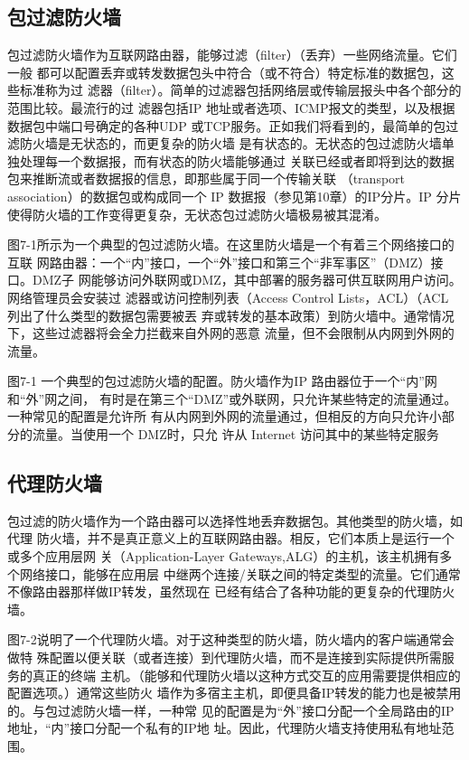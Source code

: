 \subsection{包过滤防火墙}

包过滤防火墙作为互联网路由器，能够过滤（filter）（丢弃）一些网络流量。它们一般
都可以配置丢弃或转发数据包头中符合（或不符合）特定标准的数据包，这些标准称为过
滤器（filter）。简单的过滤器包括网络层或传输层报头中各个部分的范围比较。最流行的过
滤器包括IP 地址或者选项、ICMP报文的类型，以及根据数据包中端口号确定的各种UDP
或TCP服务。正如我们将看到的，最简单的包过滤防火墙是无状态的，而更复杂的防火墙
是有状态的。无状态的包过滤防火墙单独处理每一个数据报，而有状态的防火墙能够通过
关联已经或者即将到达的数据包来推断流或者数据报的信息，即那些属于同一个传输关联
（transport association）的数据包或构成同一个 IP 数据报（参见第10章）的IP分片。IP 分片
使得防火墙的工作变得更复杂，无状态包过滤防火墙极易被其混淆。

图7-1所示为一个典型的包过滤防火墙。在这里防火墙是一个有着三个网络接口的互联
网路由器：一个“内”接口，一个“外”接口和第三个“非军事区”（DMZ）接口。DMZ子
网能够访问外联网或DMZ，其中部署的服务器可供互联网用户访问。网络管理员会安装过
滤器或访问控制列表（Access Control Lists，ACL）（ACL 列出了什么类型的数据包需要被丟
弃或转发的基本政策）到防火墙中。通常情况下，这些过滤器将会全力拦截来自外网的恶意
流量，但不会限制从内网到外网的流量。

图7-1 一个典型的包过滤防火墙的配置。防火墙作为IP 路由器位于一个“内”网和“外”网之间，
有时是在第三个“DMZ”或外联网，只允许某些特定的流量通过。一种常见的配置是允许所
有从内网到外网的流量通过，但相反的方向只允许小部分的流量。当使用一个 DMZ时，只允
许从 Internet 访问其中的某些特定服务

\subsection{代理防火墙}

包过滤的防火墙作为一个路由器可以选择性地丢弃数据包。其他类型的防火墙，如代理
防火墙，并不是真正意义上的互联网路由器。相反，它们本质上是运行一个或多个应用层网
关（Application-Layer Gateways,ALG）的主机，该主机拥有多个网络接口，能够在应用层
中继两个连接/关联之间的特定类型的流量。它们通常不像路由器那样做IP转发，虽然现在
已经有结合了各种功能的更复杂的代理防火墙。

图7-2说明了一个代理防火墙。对于这种类型的防火墙，防火墙内的客户端通常会做特
殊配置以便关联（或者连接）到代理防火墙，而不是连接到实际提供所需服务的真正的终端
主机。（能够和代理防火墙以这种方式交互的应用需要提供相应的配置选项。）通常这些防火
墙作为多宿主主机，即便具备IP转发的能力也是被禁用的。与包过滤防火墙一样，一种常
见的配置是为“外”接口分配一个全局路由的IP 地址，“内”接口分配一个私有的IP地
址。因此，代理防火墙支持使用私有地址范围。

